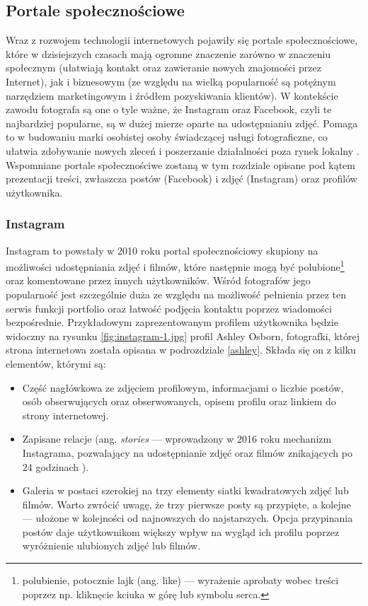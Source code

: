 \documentclass[12pt]{article}
\numberwithin{figure}{section}
\begin{document}
\begin{sloppypar}

\subsection{Portale społecznościowe}

Wraz z rozwojem technologii internetowych pojawiły się portale społecznościowe, które w dzisiejszych czasach mają ogromne znaczenie zarówno w znaczeniu społecznym (ułatwiają kontakt oraz zawieranie nowych znajomości przez Internet), jak i biznesowym (ze względu na wielką popularność są potężnym narzędziem marketingowym i źródłem pozyskiwania klientów). W kontekście zawodu fotografa są one o tyle ważne, że Instagram oraz Facebook, czyli te najbardziej popularne, są w dużej mierze oparte na udostępnianiu zdjęć. Pomaga to w budowaniu marki osobistej osoby świadczącej usługi fotograficzne, co ułatwia zdobywanie nowych zleceń i poszerzanie działalności poza rynek lokalny \cite{socialmedia}. Wspomniane portale społecznościwe zostaną w tym rozdziale opisane pod kątem prezentacji treści, zwłaszcza postów (Facebook) i zdjęć (Instagram) oraz profilów użytkownika.


\subsubsection{Instagram}

Instagram to powstały w 2010 roku \cite{instagramfirstday} portal społecznościowy skupiony na możliwości udostępniania zdjęć i filmów, które następnie mogą być polubione\footnote{polubienie, potocznie lajk (ang. like) --- wyrażenie aprobaty wobec treści poprzez np. kliknęcie kciuka w górę lub symbolu serca.} oraz komentowane przez innych użytkowników. Wśród fotografów jego popularność jest szczególnie duża ze względu na możliwość pełnienia przez ten serwis funkcji portfolio oraz łatwość podjęcia kontaktu poprzez wiadomości bezpośrednie. Przykładowym zaprezentowanym profilem użytkownika będzie widoczny na rysunku \ref{fig:instagram-1.jpg} profil Ashley Osborn, fotografki, której strona internetowa została opisana w podrozdziale \ref{ashley}. Składa się on z kilku elementów, którymi są: 
\begin{itemize}
    \item Część nagłówkowa ze zdjęciem profilowym, informacjami o liczbie postów, osób obserwujących oraz obserwowanych, opisem profilu oraz linkiem do strony internetowej.
    \item Zapisane relacje (ang. \textit{stories} --- wprowadzony w 2016 roku mechanizm Instagrama, pozwalający na udostępnianie zdjęć oraz filmów znikających po 24 godzinach \cite{stories}).
    \item Galeria w postaci szerokiej na trzy elementy siatki kwadratowych zdjęć lub filmów. Warto zwrócić uwagę, że trzy pierwsze posty są przypięte, a kolejne --- ułożone w kolejności od najnowszych do najstarszych. Opcja przypinania postów daje użytkownikom większy wpływ na wygląd ich profilu poprzez wyróżnienie ulubionych zdjęć lub filmów.
\end{itemize}


\end{sloppypar}
\end{document}
